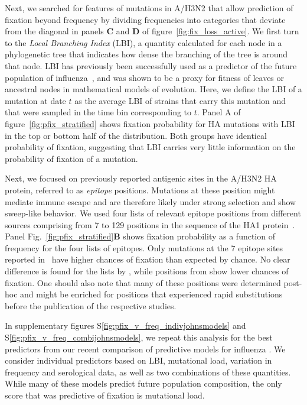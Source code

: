 \documentclass[reprint,amsmath,amssymb,superscriptaddress,showpacs,rmp]{revtex4-1}
\newcommand{\sref}[1]{S\ref{#1}}
\begin{document}
Next, we searched for features of mutations in A/H3N2 that allow prediction of fixation beyond frequency by dividing frequencies into categories that deviate from the diagonal in panels \textbf{C} and \textbf{D} of figure~\ref{fig:fix_loss_active}.
We first turn to the \emph{Local Branching Index} (LBI), a quantity calculated for each node in a phylogenetic tree that indicates how dense the branching of the tree is around that node.
LBI has previously been successfully used as a predictor of the future population of influenza~\cite{neher_predicting_2014}, and was shown to be a proxy for fitness of leaves or ancestral nodes in mathematical models of evolution.
Here, we define the LBI of a mutation at date $t$ as the average LBI of strains that carry this mutation and that were sampled in the time bin corresponding to $t$.
Panel A of figure~\ref{fig:pfix_stratified} shows fixation probability for HA mutations with LBI in the top or bottom half of the distribution.
Both groups have identical probability of fixation, suggesting that LBI carries very little information on the probability of fixation of a mutation.

Next, we focused on previously reported antigenic sites in the A/H3N2 HA protein, referred to as \emph{epitope} positions.
Mutations at these position might mediate immune escape and are therefore likely under strong selection and show sweep-like behavior.
We used four lists of relevant epitope positions from different sources comprising from 7 to 129 positions in the sequence of the HA1 protein~\cite{Koel976, luksza_predictive_2014, Shih6283, wolf_long_2006}.
Panel Fig.~\ref{fig:pfix_stratified}\textbf{B} shows fixation probability as a function of frequency for the four lists of epitopes.
Only mutations at the 7 epitope sites reported in~\cite{Koel976} have higher chances of fixation than expected by chance.
No clear difference is found for the lists by \citet{luksza_predictive_2014, wolf_long_2006}, while positions from \citet{Shih6283} show lower chances of fixation.
One should also note that many of these positions were determined post-hoc and might be enriched for positions that experienced rapid substitutions before the publication of the respective studies.

In supplementary figures \sref{fig:pfix_v_freq_indivjohnsmodels} and \sref{fig:pfix_v_freq_combijohnsmodels}, we repeat this analysis for the best predictors from our recent comparison of predictive models for influenza \citep{huddleston_integrating_2020}.
We consider individual predictors based on LBI, mutational load, variation in frequency and serological data, as well as two combinations of these quantities. 
While many of these models predict future population composition, the only score that was predictive of fixation is mutational load.
\end{document}
